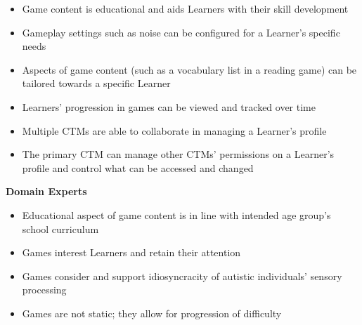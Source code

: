 \documentclass[12pt]{article}
\newcounter{srnumC} %
\newcounter{srnumD} %
\begin{document}
\noindent \begin{itemize}

  \setcounter{srnumC}{0}
  \item[\refstepcounter{srnumC}\thesrnumC \label{SR-CTM-1}:] Game content is educational and aids Learners with their skill development

  \item[\refstepcounter{srnumC}\thesrnumC \label{SR-CTM-2}:] Gameplay settings such as noise can be configured for a Learner's specific needs

  \item[\refstepcounter{srnumC}\thesrnumC \label{SR-CTM-3}:] Aspects of game content (such as a vocabulary list in a reading game) can be tailored towards a specific Learner

  \item[\refstepcounter{srnumC}\thesrnumC \label{SR-CTM-4}:] Learners' progression in games can be viewed and tracked over time

  \item[\refstepcounter{srnumC}\thesrnumC \label{SR-CTM-5}:] Multiple CTMs are able to collaborate in managing a Learner's profile

  \item[\refstepcounter{srnumC}\thesrnumC \label{SR-CTM-6}:] The primary CTM can manage other CTMs' permissions on a Learner's profile and control what can be accessed and changed

\end{itemize}

\noindent \textbf{Domain Experts}

\noindent \begin{itemize}

  \setcounter{srnumD}{0}
  \item[\refstepcounter{srnumD}\thesrnumD \label{SR-DOM-1}:] Educational aspect of game content is in line with intended age group's school curriculum

  \item[\refstepcounter{srnumD}\thesrnumD \label{SR-DOM-2}:] Games interest Learners and retain their attention

  \item[\refstepcounter{srnumD}\thesrnumD \label{SR-DOM-3}:] Games consider and support idiosyncracity of autistic individuals' sensory processing

  \item[\refstepcounter{srnumD}\thesrnumD \label{SR-DOM-4}:] Games are not static; they allow for progression of difficulty

\end{itemize}
\end{document}
